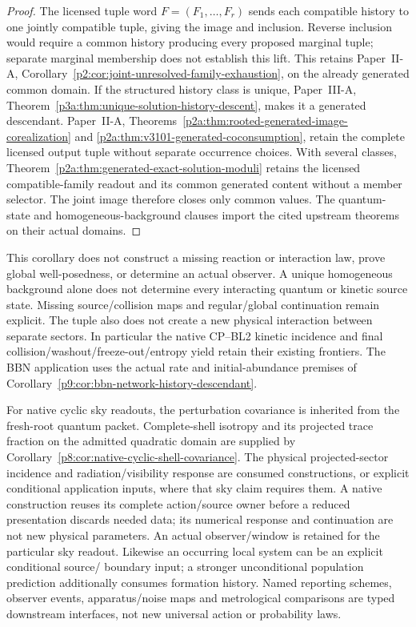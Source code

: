 \documentclass[12pt,a4paper]{article}
\begin{document}
\begin{proof}
The licensed tuple word $F=(F_1,\ldots,F_r)$ sends each compatible history
to one jointly compatible tuple, giving the image and inclusion.  Reverse
inclusion would require a common history producing every proposed marginal
tuple; separate marginal membership does not establish this lift.  This
retains Paper~II-A,
Corollary~\ref{p2:cor:joint-unresolved-family-exhaustion}, on the already
generated common domain.
If the structured history class is unique, Paper~III-A,
Theorem~\ref{p3a:thm:unique-solution-history-descent}, makes it a generated
descendant.  Paper~II-A,
Theorems~\ref{p2a:thm:rooted-generated-image-corealization} and
\ref{p2a:thm:v3101-generated-coconsumption}, retain the complete licensed
output tuple without separate occurrence choices.  With several classes,
Theorem~\ref{p2a:thm:generated-exact-solution-moduli} retains the licensed
compatible-family readout and its common generated content without a member
selector.  The joint image therefore closes only common values.
The quantum-state and homogeneous-background clauses import
the cited upstream theorems on their actual domains.
\end{proof}

This corollary does not construct a missing reaction or interaction law,
prove global well-posedness, or determine an actual observer.  A unique
homogeneous background alone does not determine every interacting quantum
or kinetic source state.  Missing source/collision maps and regular/global
continuation remain explicit.  The tuple also does not create a new physical
interaction between separate sectors.  In particular the native CP--BL2
kinetic incidence and final collision/washout/freeze-out/entropy yield retain
their existing frontiers.  The BBN application uses the actual rate and
initial-abundance premises of
Corollary~\ref{p9:cor:bbn-network-history-descendant}.

For native cyclic sky readouts, the perturbation covariance is inherited from
the fresh-root quantum packet.  Complete-shell isotropy and its projected
trace fraction on the admitted quadratic domain are supplied by
Corollary~\ref{p8:cor:native-cyclic-shell-covariance}.
The physical projected-sector incidence and radiation/visibility response
are consumed constructions, or explicit conditional application inputs,
where that sky claim requires them.  A native construction reuses its complete
action/source owner before a reduced presentation discards needed data;
its numerical response and continuation are not new physical parameters.
An actual observer/window is retained for the particular sky readout.
Likewise an occurring local system can be an explicit conditional source/
boundary input; a stronger unconditional population prediction additionally
consumes formation history.  Named reporting schemes, observer events,
apparatus/noise maps and metrological comparisons are typed downstream
interfaces, not new universal action or probability laws.
\end{document}
